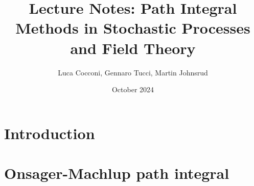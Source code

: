 \documentclass[10pt, a4paper, oneside]{book}
\title{Lecture Notes: Path Integral Methods in Stochastic Processes and Field Theory}
\author{Luca Cocconi, Gennaro Tucci, Martin Johnsrud}
\date{October 2024}
\begin{document}
\maketitle

\chapter{Introduction}


\chapter{Onsager-Machlup path integral}

\end{document}
